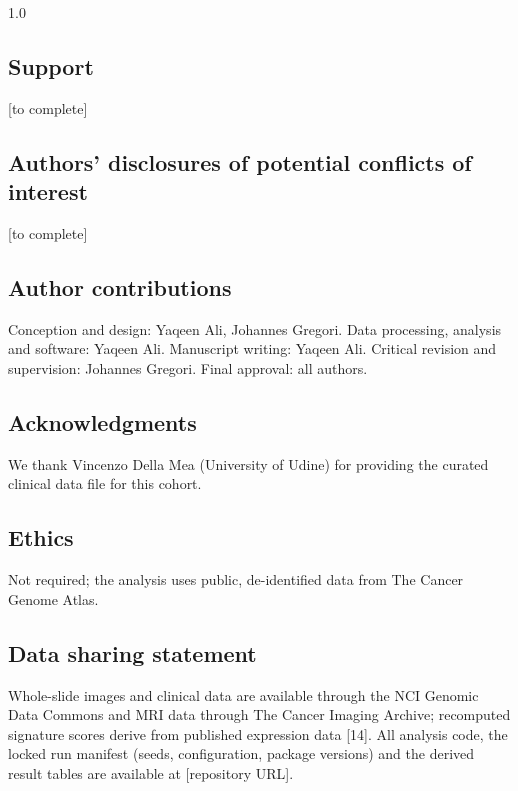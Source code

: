 \documentclass[11pt,a4paper]{article}
\begin{document}
\begin{spacing}{1.0}
\subsection*{Support}
[to complete]\par\smallskip
\subsection*{Authors' disclosures of potential conflicts of interest}
[to complete]\par\smallskip
\subsection*{Author contributions}
Conception and design: Yaqeen Ali, Johannes Gregori. Data processing, analysis and software: Yaqeen Ali. Manuscript writing: Yaqeen Ali. Critical revision and supervision: Johannes Gregori. Final approval: all authors.\par\smallskip
\subsection*{Acknowledgments}
We thank Vincenzo Della Mea (University of Udine) for providing the curated clinical data file for this cohort.\par\smallskip
\subsection*{Ethics}
Not required; the analysis uses public, de-identified data from The Cancer Genome Atlas.\par\smallskip
\subsection*{Data sharing statement}
Whole-slide images and clinical data are available through the NCI Genomic Data Commons and MRI data through The Cancer Imaging Archive; recomputed signature scores derive from published expression data [14]. All analysis code, the locked run manifest (seeds, configuration, package versions) and the derived result tables are available at [repository URL].\par\smallskip
\end{spacing}
\end{document}
